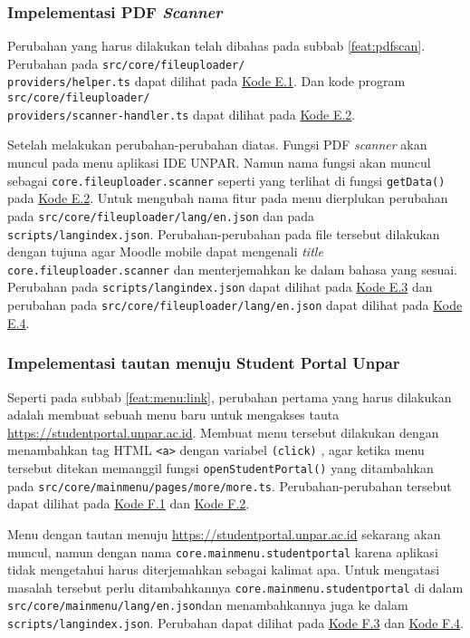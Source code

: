 \subsubsection{Impelementasi PDF \textit{Scanner}}
Perubahan yang harus dilakukan telah dibahas pada subbab \ref{feat:pdfscan}. Perubahan pada \texttt{src/core/fileuploader/\\providers/helper.ts} dapat dilihat pada \hyperref[fileuploader-helper]{Kode E.1}. Dan kode program \texttt{src/core/fileuploader/\\providers/scanner-handler.ts} dapat dilihat pada \hyperref[scanner-handler]{Kode E.2}.


Setelah melakukan perubahan-perubahan diatas. Fungsi PDF \textit{scanner} akan muncul pada menu aplikasi IDE UNPAR. Namun nama fungsi akan muncul sebagai \texttt{core.fileuploader.scanner} seperti yang terlihat di fungsi \texttt{getData()} pada \hyperref[scanner-handler]{Kode E.2}. Untuk mengubah nama fitur pada menu dierplukan perubahan pada \texttt{src/core/fileuploader/lang/en.json} dan pada \texttt{scripts/langindex.json}. Perubahan-perubahan pada file tersebut dilakukan dengan tujuna agar Moodle mobile dapat mengenali \textit{title} \texttt{core.fileuploader.scanner} dan menterjemahkan ke dalam bahasa yang sesuai.  Perubahan pada \texttt{scripts/langindex.json} dapat dilihat pada \hyperref[langindex.json]{Kode E.3}  dan perubahan pada \texttt{src/core/fileuploader/lang/en.json}  dapat dilihat pada \hyperref[fileuploader-lang-eng]{Kode E.4}.

\subsubsection{Impelementasi tautan menuju Student Portal Unpar}
Seperti pada subbab \ref{feat:menu:link}, perubahan pertama yang harus dilakukan adalah membuat sebuah menu baru untuk mengakses tauta \url{https://studentportal.unpar.ac.id}. Membuat menu tersebut dilakukan dengan menambahkan tag HTML \texttt{<a>} dengan variabel \texttt{(click)} , agar ketika menu tersebut ditekan memanggil fungsi \texttt{openStudentPortal()} yang ditambahkan pada \texttt{src/core/mainmenu/pages/more/more.ts}. Perubahan-perubahan tersebut dapat dilihat pada \hyperref[more-view]{Kode F.1} dan \hyperref[more-component]{Kode F.2}.


Menu dengan tautan menuju \url{https://studentportal.unpar.ac.id} sekarang akan muncul, namun dengan nama \texttt{core.mainmenu.studentportal} karena aplikasi tidak mengetahui harus diterjemahkan sebagai kalimat apa. Untuk mengatasi masalah tersebut perlu ditambahkannya \texttt{core.mainmenu.studentportal} di dalam \texttt{src/core/mainmenu/lang/en.json}dan menambahkannya juga ke dalam \texttt{scripts/langindex.json}. Perubahan dapat dilihat pada \hyperref[stupor-index]{Kode F.3} dan \hyperref[stupor-index-script]{Kode F.4}.

